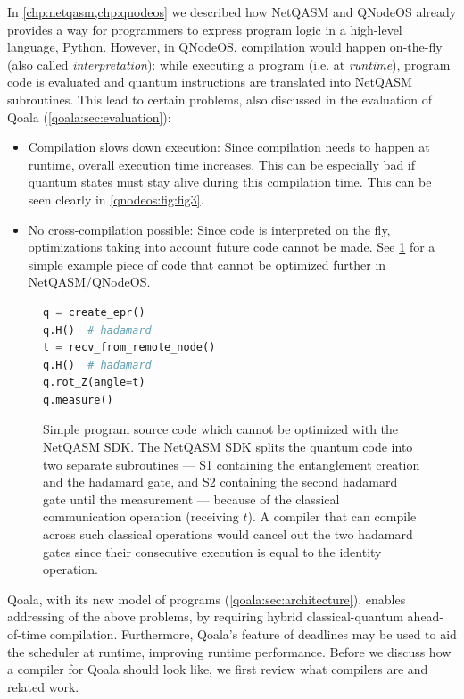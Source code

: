 In \cref{chp:netqasm,chp:qnodeos} we described how NetQASM and QNodeOS already provides a way for programmers to express program logic in a high-level language, Python.
However, in \ac{QNodeOS}, compilation would happen on-the-fly (also called \emph{interpretation}):
while executing a program (i.e. at \emph{runtime}), program code is evaluated and quantum instructions are translated into NetQASM subroutines.
This lead to certain problems, also discussed in the evaluation of Qoala (\cref{qoala:sec:evaluation}):
\begin{itemize}
  \item Compilation slows down execution:
    Since compilation needs to happen at runtime, overall execution time increases.
    This can be especially bad if quantum states must stay alive during this compilation time.
    This can be seen clearly in \cref{qnodeos:fig:fig3}.
  \item No cross-compilation possible:
    Since code is interpreted on the fly, optimizations taking into account future code cannot be made. See \cref{compiler:lst:hybrid} for a simple example piece of code that cannot be optimized further in NetQASM/QNodeOS.
\end{itemize}

\begin{figure}[t]
  \centering
  \begin{lstlisting}[language=Python]
q = create_epr()
q.H()  # hadamard
t = recv_from_remote_node()
q.H()  # hadamard
q.rot_Z(angle=t)
q.measure()
  \end{lstlisting}
  \caption{Simple program source code which cannot be optimized with the NetQASM SDK.
    The NetQASM SDK splits the quantum code into two separate subroutines ---
    S1 containing the entanglement creation and the hadamard gate, and
    S2 containing the second hadamard gate until the measurement ---
    because of the classical communication operation (receiving $t$).
    A compiler that can compile across such classical operations would cancel out the two hadamard gates since their consecutive execution is equal to the identity operation.
  }
  \label{compiler:lst:hybrid}
\end{figure}


Qoala, with its new model of programs (\cref{qoala:sec:architecture}), enables addressing of the above problems, by requiring hybrid classical-quantum ahead-of-time compilation.
Furthermore, Qoala's feature of deadlines may be used to aid the scheduler at runtime, improving runtime performance.
Before we discuss how a compiler for Qoala should look like, we first review what compilers are and related work.


